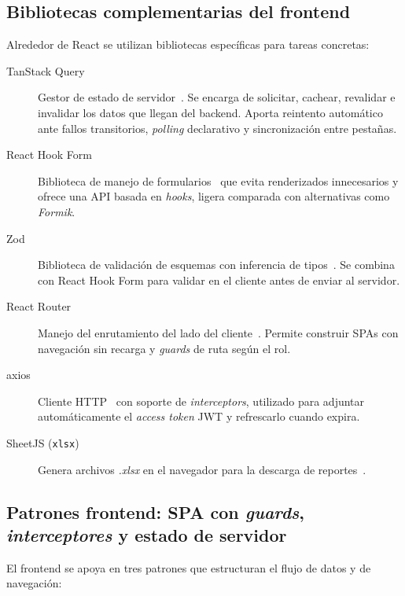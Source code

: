 \subsection{Bibliotecas complementarias del frontend}

Alrededor de React se utilizan bibliotecas específicas para tareas concretas:

\begin{description}
    \item[TanStack Query] Gestor de estado de servidor~\cite{tanstack2024}. Se encarga de solicitar, cachear, revalidar e invalidar los datos que llegan del backend. Aporta reintento automático ante fallos transitorios, \emph{polling} declarativo y sincronización entre pestañas.
    \item[React Hook Form] Biblioteca de manejo de formularios~\cite{rhf2024} que evita renderizados innecesarios y ofrece una API basada en \emph{hooks}, ligera comparada con alternativas como \emph{Formik}.
    \item[Zod] Biblioteca de validación de esquemas con inferencia de tipos~\cite{zod2024}. Se combina con React Hook Form para validar en el cliente antes de enviar al servidor.
    \item[React Router] Manejo del enrutamiento del lado del cliente~\cite{reactrouter2024}. Permite construir SPAs con navegación sin recarga y \emph{guards} de ruta según el rol.
    \item[axios] Cliente HTTP~\cite{axios2024} con soporte de \emph{interceptors}, utilizado para adjuntar automáticamente el \emph{access token} JWT y refrescarlo cuando expira.
    \item[SheetJS (\texttt{xlsx})] Genera archivos \emph{.xlsx} en el navegador para la descarga de reportes~\cite{sheetjs2024}.
\end{description}

\subsection{Patrones frontend: SPA con \emph{guards}, \emph{interceptores} y estado de servidor}\label{subsec:patrones-front}

El frontend se apoya en tres patrones que estructuran el flujo de datos y de navegación:

